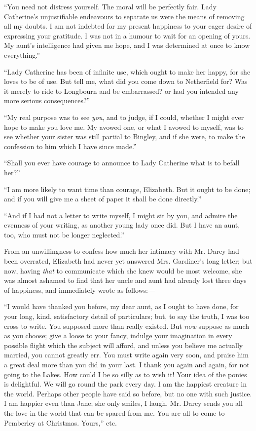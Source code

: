 \documentclass[12pt,openright]{book}
\begin{document}
“You need not distress yourself. The moral will be perfectly fair. Lady Catherine’s unjustifiable endeavours to separate us were the means of removing all my doubts. I am not indebted for my present happiness to your eager desire of expressing your gratitude. I was not in a humour to wait for an opening of yours. My aunt’s intelligence had given me hope, and I was determined at once to know everything.”

“Lady Catherine has been of infinite use, which ought to make her happy, for she loves to be of use. But tell me, what did you come down to Netherfield for? Was it merely to ride to Longbourn and be embarrassed? or had you intended any more serious consequences?”

“My real purpose was to see \textit{you}, and to judge, if I could, whether I might ever hope to make you love me. My avowed one, or what I avowed to myself, was to see whether your sister was still partial to Bingley, and if she were, to make the confession to him which I have since made.”

“Shall you ever have courage to announce to Lady Catherine what is to befall her?”

“I am more likely to want time than courage, Elizabeth. But it ought to be done; and if you will give me a sheet of paper it shall be done directly.”

“And if I had not a letter to write myself, I might sit by you, and admire the evenness of your writing, as another young lady once did. But I have an aunt, too, who must not be longer neglected.”

From an unwillingness to confess how much her intimacy with Mr. Darcy had been overrated, Elizabeth had never yet answered Mrs. Gardiner’s long letter; but now, having \textit{that} to communicate which she knew would be most welcome, she was almost ashamed to find that her uncle and aunt had already lost three days of happiness, and immediately wrote as follows:—

“I would have thanked you before, my dear aunt, as I ought to have done, for your long, kind, satisfactory detail of particulars; but, to say the truth, I was too cross to write. You supposed more than really existed. But \textit{now} suppose as much as you choose; give a loose to your fancy, indulge your imagination in every possible flight which the subject will afford, and unless you believe me actually married, you cannot greatly err. You must write again very soon, and praise him a great deal more than you did in your last. I thank you again and again, for not going to the Lakes. How could I be so silly as to wish it! Your idea of the ponies is delightful. We will go round the park every day. I am the happiest creature in the world. Perhaps other people have said so before, but no one with such justice. I am happier even than Jane; she only smiles, I laugh. Mr. Darcy sends you all the love in the world that can be spared from me. You are all to come to Pemberley at Christmas. Yours,” etc.
\end{document}
